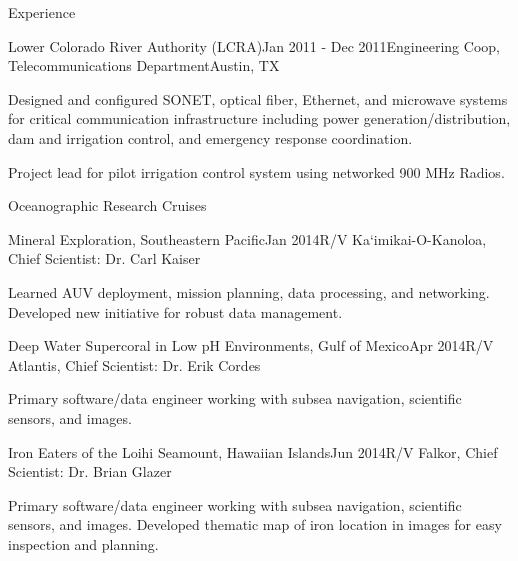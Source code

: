 \documentclass{resume} %
\begin{document}
\begin{rSection}{Experience}

\begin{rSubsection}{Lower Colorado River Authority (LCRA)}{Jan 2011 - Dec 2011}{Engineering Coop, Telecommunications Department}{Austin, TX}
\item{Designed and configured SONET, optical fiber, Ethernet, and microwave systems for critical communication infrastructure including power generation/distribution, dam and 
            irrigation control, and emergency response coordination. }
\item{Project lead for pilot irrigation control system using networked 900 MHz Radios.}
\end{rSubsection}
\end{rSection}
\begin{rSection}{Oceanographic Research Cruises}

\begin{rSubsection}{Mineral Exploration, Southeastern Pacific}{Jan 2014}{R/V Ka`imikai-O-Kanoloa, Chief Scientist: Dr. Carl Kaiser}{}
\item{Learned AUV deployment, mission planning, data processing, and networking. Developed new initiative for robust data management.}
\end{rSubsection}


\begin{rSubsection}{Deep Water Supercoral in Low pH Environments, Gulf of Mexico}{Apr 2014}{R/V Atlantis, Chief Scientist: Dr. Erik Cordes}{}
\item{Primary software/data engineer working with subsea navigation, scientific sensors, and images.}
\end{rSubsection}

\begin{rSubsection}{Iron Eaters of the Loihi Seamount, Hawaiian Islands}{Jun 2014}{R/V Falkor, Chief Scientist: Dr. Brian Glazer}{}
\item{Primary software/data engineer working with subsea navigation, scientific sensors, and images. Developed thematic map of iron location in images for easy inspection and planning. }
\end{rSubsection}



\end{rSection}
\end{document}
